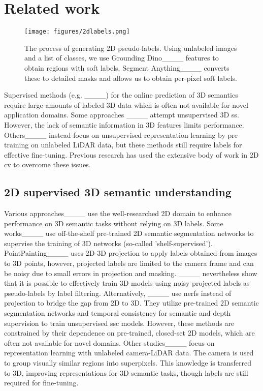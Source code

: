 \section{Related work}
{\begin{figure*}
\texttt{[image: figures/2dlabels.png]}
\caption{The process of generating 2D pseudo-labels. Using unlabeled images and a list of classes, we use Grounding Dino____ features to obtain regions with soft labels. Segment Anything____ converts these to detailed masks and allows us to obtain per-pixel soft labels.}
\vspace*{-\baselineskip}
\label{2dlabels}
\end{figure*}}

Supervised methods (e.g. ____) for the online prediction of 3D semantics require large amounts of labeled 3D data which is often not available for novel application domains. 
Some approaches ____ attempt unsupervised 3D \gls{ss}. However, the lack of semantic information in 3D features limits performance. Others____ instead focus on unsupervised representation learning by pre-training on unlabeled LiDAR data, but these methods still require labels for effective fine-tuning. 
Previous research has used the extensive body of work in 2D \gls{cv} to overcome these issues.


\subsection{2D supervised 3D semantic understanding}
Various approaches____ use the well-researched 2D domain to enhance performance on 3D semantic tasks without relying on 3D labels.
Some works____ use off-the-shelf pre-trained 2D semantic segmentation networks to supervise the training of 3D networks (so-called 'shelf-supervised'). PointPainting____ uses 2D-3D projection to apply labels obtained from images to 3D points, however, projected labels are limited to the camera frame and can be noisy due to small errors in projection and masking. ____ nevertheless show that it is possible to effectively train 3D models using noisy projected labels as pseudo-labels by label filtering. Alternatively, ____ use \glspl{nerf} instead of projection to bridge the gap from 2D to 3D.  They utilize pre-trained 2D semantic segmentation networks and temporal consistency for semantic and depth supervision to train unsupervised \gls{ssc} models. 
However, these methods are constrained by their dependence on pre-trained, closed-set 2D models, which are often not available for novel domains.
Other studies____ focus on representation learning with unlabeled camera-LiDAR data. The camera is used to group visually similar regions into superpixels. This knowledge is transferred to 3D, improving representations for 3D semantic tasks, though labels are still required for fine-tuning. 

